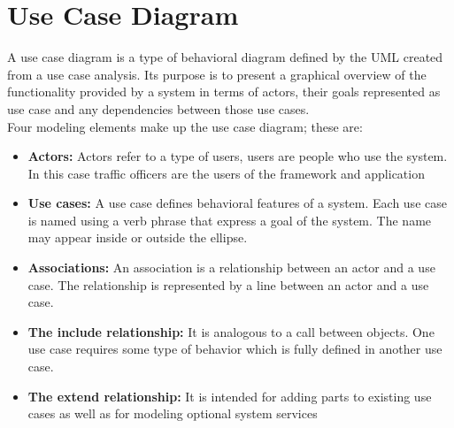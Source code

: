 \documentclass[openany,12pt]{report}
\begin{document}
	\section{Use Case Diagram}
	\hspace*{0.5in} A use case diagram is a type of behavioral diagram defined by the UML created from a use case analysis. Its purpose is to present a graphical overview of the functionality provided by a system in terms of actors, their goals represented as use case and any dependencies between those use cases.\\
	\hspace*{0.5in}Four modeling elements make up the use case diagram; these are:\\
	\begin{itemize}
		\item{\textbf{Actors:} Actors refer to a type of users, users are people who use the system. In this case traffic officers are the users of the framework and application}
		\item{\textbf{Use cases:} A use case defines behavioral features of a system. Each use case is named using a verb phrase that express a goal of the system. The name may appear inside or outside the ellipse.}
		\item{\textbf{Associations:} An association is a relationship between an actor and a use case. The relationship is represented by a line between an actor and a use case.}
		\item{\textbf{The include relationship:} It is analogous to a call between objects. One use case requires some type of behavior which is fully defined in  another use case.}
		\item{\textbf{The extend relationship:} It is intended for adding parts to existing use cases as well as for modeling optional system services}
	\end{itemize}
\end{document}

